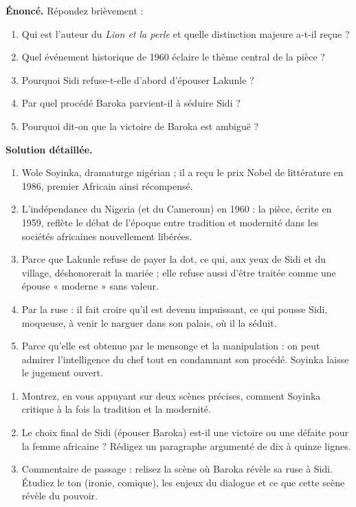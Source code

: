 \documentclass[11pt]{article}
\begin{document}
\begin{exoresolu}
\textbf{Énoncé.} Répondez brièvement :
\begin{enumerate}
\item Qui est l'auteur du \emph{Lion et la perle} et quelle distinction majeure a-t-il reçue ?
\item Quel événement historique de 1960 éclaire le thème central de la pièce ?
\item Pourquoi Sidi refuse-t-elle d'abord d'épouser Lakunle ?
\item Par quel procédé Baroka parvient-il à séduire Sidi ?
\item Pourquoi dit-on que la victoire de Baroka est ambiguë ?
\end{enumerate}
\tcblower
\textbf{Solution détaillée.}
\begin{enumerate}
\item Wole Soyinka, dramaturge nigérian ; il a reçu le prix Nobel de littérature en 1986, premier Africain ainsi récompensé.
\item L'indépendance du Nigeria (et du Cameroun) en 1960 : la pièce, écrite en 1959, reflète le débat de l'époque entre tradition et modernité dans les sociétés africaines nouvellement libérées.
\item Parce que Lakunle refuse de payer la dot, ce qui, aux yeux de Sidi et du village, déshonorerait la mariée ; elle refuse aussi d'être traitée comme une épouse « moderne » sans valeur.
\item Par la ruse : il fait croire qu'il est devenu impuissant, ce qui pousse Sidi, moqueuse, à venir le narguer dans son palais, où il la séduit.
\item Parce qu'elle est obtenue par le mensonge et la manipulation : on peut admirer l'intelligence du chef tout en condamnant son procédé. Soyinka laisse le jugement ouvert.
\end{enumerate}
\end{exoresolu}

\begin{exercice}
\begin{enumerate}
\item Montrez, en vous appuyant sur deux scènes précises, comment Soyinka critique à la fois la tradition et la modernité.
\item Le choix final de Sidi (épouser Baroka) est-il une victoire ou une défaite pour la femme africaine ? Rédigez un paragraphe argumenté de dix à quinze lignes.
\item Commentaire de passage : relisez la scène où Baroka révèle sa ruse à Sidi. Étudiez le ton (ironie, comique), les enjeux du dialogue et ce que cette scène révèle du pouvoir.
\end{enumerate}
\end{exercice}
\end{document}
